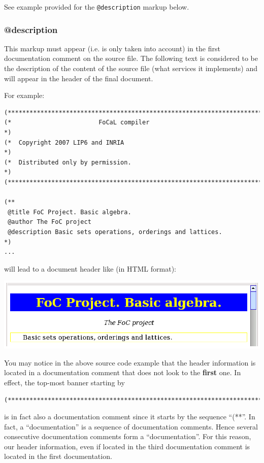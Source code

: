 See example provided for the {\tt @description} markup below.



\subsubsection{@description}
This markup must appear (i.e. is only taken into account) in the first
documentation comment on the source file. The following text is
considered to be the description of the content of the source file
(what services it implements) and will appear in the header of the
final document.

For example:
{\scriptsize
\begin{lstlisting}
(***********************************************************************)
(*                        FoCaL compiler                               *)
(*  Copyright 2007 LIP6 and INRIA                                      *)
(*  Distributed only by permission.                                    *)
(***********************************************************************)

(**
 @title FoC Project. Basic algebra.
 @author The FoC project
 @description Basic sets operations, orderings and lattices.
*)
...
\end{lstlisting}
}
will lead to a document header like (in HTML format):

\medskip
\includegraphics{header_html_snapshot.ps}

You may notice in the above source code example that the header
information is located in a documentation comment that does not look
to the {\bf first} one. In effect, the top-most banner starting by
{\scriptsize
\begin{lstlisting}
(***********************************************************************)
\end{lstlisting}
}
is in fact also a documentation comment since it starts by the
sequence ``(**''. In fact, a ``documentation'' is a sequence of
documentation comments. Hence several consecutive documentation
comments form a ``documentation''. For this reason, our header
information, even if located in the third documentation comment is
located in the first documentation.


